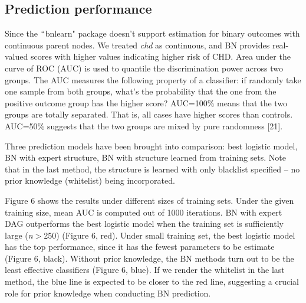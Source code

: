 \documentclass{article}
\begin{document}
\subsection{Prediction performance}
Since the $``$bnlearn" package doesn’t support estimation for binary outcomes with continuous parent nodes. We treated \textit{chd} as continuous, and BN provides real-valued scores with higher values indicating higher risk of CHD. Area under the curve of ROC (AUC) is used to quantile the discrimination power across two groups. The AUC measures the following property of a classifier: if randomly take one sample from both groups, what’s the probability that the one from the positive outcome group has the higher score? AUC=100$\%$ means that the two groups are totally separated. That is, all cases have higher scores than controls. AUC=50$\%$ suggests that the two groups are mixed by pure randomness [21]. \par

Three prediction models have been brought into comparison: best logistic model, BN with expert structure, BN with structure learned from training sets. Note that in the last method, the structure is learned with only blacklist specified – no prior knowledge (whitelist) being incorporated. \par

Figure 6 shows the results under different sizes of training sets. Under the given training size, mean AUC is computed out of 1000 iterations. BN with expert DAG outperforms the best logistic model when the training set is sufficiently large (\textit{n}$>$250) (Figure 6, red). Under small training set, the best logistic model has the top performance, since it has the fewest parameters to be estimate (Figure 6, black). Without prior knowledge, the BN methods turn out to be the least effective classifiers (Figure 6, blue). If we render the whitelist in the last method, the blue line is expected to be closer to the red line, suggesting a crucial role for prior knowledge when conducting BN prediction. \par
\end{document}
